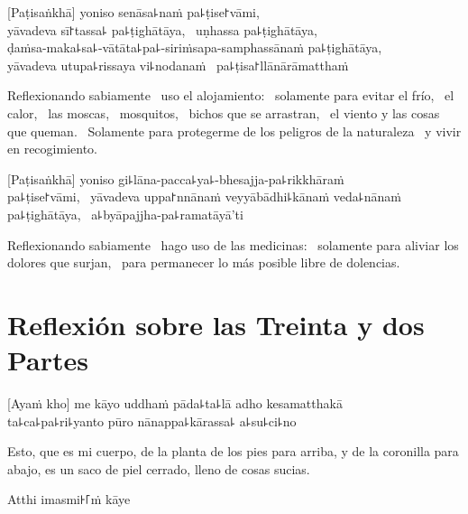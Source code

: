 \clearpage

[Paṭisaṅkhā] yoniso senāsa꜕naṁ pa꜕ṭise꜓vāmi, \pause\\
yāvadeva sī꜓tassa꜕ pa꜕ṭighātāya, \pause\ uṇhassa pa꜕ṭighātāya, \pause\\
ḍaṁsa-maka꜕sa꜕-vātāta꜕pa꜕-siriṁsapa-samphassānaṁ pa꜕ṭighātāya, \pause\\
yāvadeva utupa꜕rissaya vi꜕nodanaṁ \pause\ pa꜕ṭisa꜓llānārāmatthaṁ

\begin{english}
  Reflexionando sabiamente \pause\ uso el alojamiento: \pause\ solamente para evitar el
  frío, \pause\ el calor, \pause\ las moscas, \pause\ mosquitos, \pause\ bichos
  que se arrastran, \pause\ el viento y las cosas que queman. \pause\ Solamente para
  protegerme de los peligros de la naturaleza \pause\ y vivir en recogimiento.
\end{english}

[Paṭisaṅkhā] yoniso gi꜕lāna-pacca꜕ya꜕-bhesajja-pa꜕rikkhāraṁ\\
pa꜕ṭise꜓vāmi, \pause\ yāvadeva uppa꜓nnānaṁ veyyābādhi꜕kānaṁ veda꜕nānaṁ
pa꜕ṭighātāya, \pause\ a꜕byāpajjha-pa꜕ramatāyā'ti

\begin{english}
  Reflexionando sabiamente \pause\ hago uso de las medicinas: \pause\ solamente para aliviar los dolores que surjan,
  \pause\ para permanecer lo más posible libre de dolencias.
\end{english}

\chapter[Treinta y dos Partes]{Reflexión sobre las Treinta y dos Partes}


\begin{leader}
\end{leader}

[Ayaṁ kho] me kāyo uddhaṁ pāda꜕ta꜕lā adho kesamatthakā\\
ta꜕ca꜕pa꜕ri꜕yanto pūro nānappa꜕kārassa꜕ a꜕su꜕ci꜕no

\begin{english}
  Esto, que es mi cuerpo, de la planta de los pies para arriba, y de la coronilla para abajo, es un saco de piel cerrado, lleno de cosas sucias.
\end{english}

Atthi imasmi꜔꜒ṁ kāye

